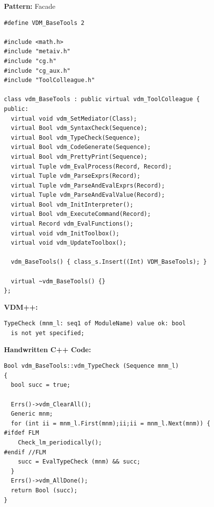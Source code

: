 \documentclass[dvips]{slides}
\newcommand{\omt}[1]{\resizebox{\textwidth}{!}{\rotatebox{-90}{\texttt{[image: \#1]}}}}
\begin{document}
\begin{slide}{}

{\bf Pattern:} Facade
\begin{center}
\omt{basetools.eps}
\end{center}
\end{slide}


\begin{slide}{}

\tiny
\begin{verbatim}
#define VDM_BaseTools 2

#include <math.h>
#include "metaiv.h"
#include "cg.h"
#include "cg_aux.h"
#include "ToolColleague.h"

class vdm_BaseTools : public virtual vdm_ToolColleague {
public:
  virtual void vdm_SetMediator(Class);
  virtual Bool vdm_SyntaxCheck(Sequence);
  virtual Bool vdm_TypeCheck(Sequence);
  virtual Bool vdm_CodeGenerate(Sequence);
  virtual Bool vdm_PrettyPrint(Sequence);
  virtual Tuple vdm_EvalProcess(Record, Record);
  virtual Tuple vdm_ParseExprs(Record);
  virtual Tuple vdm_ParseAndEvalExprs(Record);
  virtual Tuple vdm_ParseAndEvalValue(Record);
  virtual Bool vdm_InitInterpreter();
  virtual Bool vdm_ExecuteCommand(Record);
  virtual Record vdm_EvalFunctions();
  virtual void vdm_InitToolbox();
  virtual void vdm_UpdateToolbox();

  vdm_BaseTools() { class_s.Insert((Int) VDM_BaseTools); }

  virtual ~vdm_BaseTools() {}
};
\end{verbatim}
\end{slide}


\begin{slide}{}

\vspace{1cm}
{\bf VDM++:}
\tiny
\begin{verbatim}
TypeCheck (mnm_l: seq1 of ModuleName) value ok: bool
  is not yet specified;
\end{verbatim}

\vspace{1cm}
{\bf Handwritten C++ Code:}
\tiny
\begin{verbatim}
Bool vdm_BaseTools::vdm_TypeCheck (Sequence mnm_l)
{
  bool succ = true;
  
  Errs()->vdm_ClearAll();
  Generic mnm;
  for (int ii = mnm_l.First(mnm);ii;ii = mnm_l.Next(mnm)) {
#ifdef FLM
    Check_lm_periodically();
#endif //FLM
    succ = EvalTypeCheck (mnm) && succ;
  }
  Errs()->vdm_AllDone();
  return Bool (succ);
}
\end{verbatim}
\end{slide}
\end{document}
